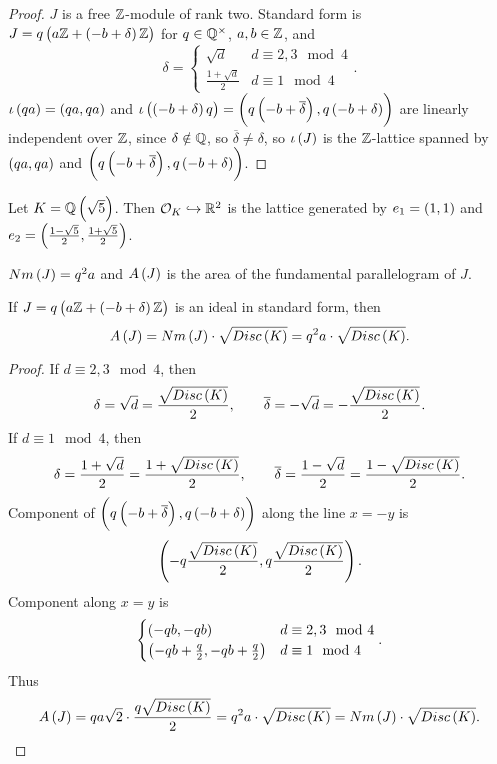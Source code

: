 \begin{proof}
$ J $ is a free $ \mathbb{Z} $-module of rank two. Standard form is $ J = q\br{a\Z + \br{-b + \delta}\Z} $ for $ q \in \mathbb{Q}^\times $, $ a, b \in \mathbb{Z} $, and
$$ \delta =
\begin{cases}
\sqrt{d} & d \equiv 2, 3 \mod 4 \\
\tfrac{1 + \sqrt{d}}{2} & d \equiv 1 \mod 4
\end{cases}.
$$
$ \iota\br{qa} = \br{qa, qa} $ and $ \iota\br{\br{-b + \delta}q} = \br{q\br{-b + \overline{\delta}}, q\br{-b + \delta}} $ are linearly independent over $ \mathbb{Z} $, since $ \delta \notin \mathbb{Q} $, so $ \overline{\delta} \ne \delta $, so $ \iota\br{J} $ is the $ \mathbb{Z} $-lattice spanned by $ \br{qa, qa} $ and $ \br{q\br{-b + \overline{\delta}}, q\br{-b + \delta}} $.
\end{proof}

\begin{example*}
Let $ K = \Q\br{\sqrt{5}} $. Then $ \mathcal{O}_K \hookrightarrow \mathbb{R}^2 $ is the lattice generated by $ e_1 = \br{1, 1} $ and $ e_2 = \br{\tfrac{1 - \sqrt{5}}{2}, \tfrac{1 + \sqrt{5}}{2}} $.
\end{example*}

\pagebreak

$ Nm\br{J} = q^2a $ and $ A\br{J} $ is the area of the fundamental parallelogram of $ J $.

\begin{proposition}
If $ J = q\br{a\Z + \br{-b + \delta}\Z} $ is an ideal in standard form, then
$$ A\br{J} = Nm\br{J} \cdot \sqrt{Disc\br{K}} = q^2a \cdot \sqrt{Disc\br{K}}. $$
\end{proposition}

\begin{proof}
If $ d \equiv 2, 3 \mod 4 $, then
$$ \delta = \sqrt{d} = \dfrac{\sqrt{Disc\br{K}}}{2}, \qquad \overline{\delta} = -\sqrt{d} = -\dfrac{\sqrt{Disc\br{K}}}{2}. $$
If $ d \equiv 1 \mod 4 $, then
$$ \delta = \dfrac{1 + \sqrt{d}}{2} = \dfrac{1 + \sqrt{Disc\br{K}}}{2}, \qquad \overline{\delta} = \dfrac{1 - \sqrt{d}}{2} = \dfrac{1 - \sqrt{Disc\br{K}}}{2}. $$
Component of $ \br{q\br{-b + \overline{\delta}}, q\br{-b + \delta}} $ along the line $ x = -y $ is
$$ \br{-q\dfrac{\sqrt{Disc\br{K}}}{2}, q\dfrac{\sqrt{Disc\br{K}}}{2}}. $$
Component along $ x = y $ is
$$
\begin{cases}
\br{-qb, -qb} & d \equiv 2, 3 \mod 4 \\
\br{-qb + \tfrac{q}{2}, -qb + \tfrac{q}{2}} & d \equiv 1 \mod 4
\end{cases}.
$$
Thus
$$ A\br{J} = qa\sqrt{2} \cdot \dfrac{q\sqrt{Disc\br{K}}}{2} = q^2a \cdot \sqrt{Disc\br{K}} = Nm\br{J} \cdot \sqrt{Disc\br{K}}. $$
\end{proof}

